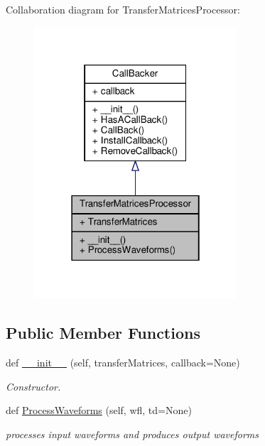 Collaboration diagram for Transfer\+Matrices\+Processor\+:\nopagebreak
\begin{figure}[H]
\begin{center}
\leavevmode
\includegraphics[width=214pt]{classSignalIntegrity_1_1TimeDomain_1_1Filters_1_1TransferMatricesProcessor_1_1TransferMatricesProcessor__coll__graph}
\end{center}
\end{figure}
\subsection*{Public Member Functions}
\begin{DoxyCompactItemize}
\item 
def \hyperlink{classSignalIntegrity_1_1TimeDomain_1_1Filters_1_1TransferMatricesProcessor_1_1TransferMatricesProcessor_a5ebf8388e92aaa7273f885b0ee6d418e}{\+\_\+\+\_\+init\+\_\+\+\_\+} (self, transfer\+Matrices, callback=None)
\begin{DoxyCompactList}\small\item\em Constructor. \end{DoxyCompactList}\item 
def \hyperlink{classSignalIntegrity_1_1TimeDomain_1_1Filters_1_1TransferMatricesProcessor_1_1TransferMatricesProcessor_a407999013bef4f9b70aae3375dc839c9}{Process\+Waveforms} (self, wfl, td=None)
\begin{DoxyCompactList}\small\item\em processes input waveforms and produces output waveforms \end{DoxyCompactList}\end{DoxyCompactItemize}


